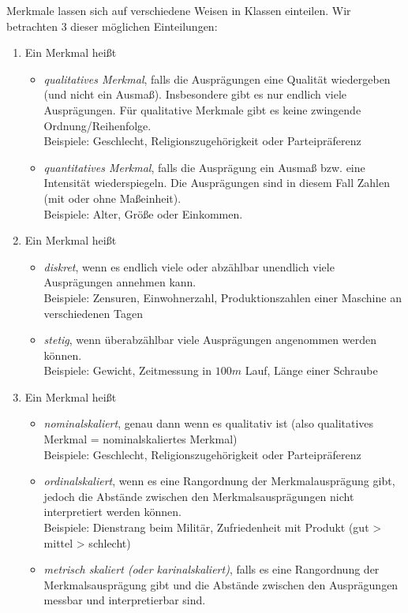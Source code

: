  Merkmale lassen sich auf verschiedene Weisen in Klassen einteilen. Wir betrachten 3 dieser möglichen Einteilungen:
\begin{enumerate}[label=(\Alph*)]
\item Ein Merkmal heißt
\begin{itemize}
\item \emph{qualitatives Merkmal}, falls die Ausprägungen eine Qualität wiedergeben (und nicht ein Ausmaß). Insbesondere gibt es nur endlich viele Ausprägungen. Für qualitative Merkmale gibt es keine zwingende Ordnung/Reihenfolge.\\
Beispiele: Geschlecht, Religionszugehörigkeit oder Parteipräferenz
\item \emph{quantitatives Merkmal}, falls die Ausprägung ein Ausmaß bzw. eine Intensität wiederspiegeln. Die Ausprägungen sind in diesem Fall Zahlen (mit oder ohne Maßeinheit).\\
Beispiele: Alter, Größe oder Einkommen.
\end{itemize}
\item Ein Merkmal heißt
\begin{itemize}
\item \emph{diskret}, wenn es endlich viele oder abzählbar unendlich viele Ausprägungen annehmen kann.\\
Beispiele: Zensuren, Einwohnerzahl, Produktionszahlen einer Maschine an verschiedenen Tagen
\item \emph{stetig}, wenn überabzählbar viele Ausprägungen angenommen werden können.\\
Beispiele: Gewicht, Zeitmessung in $100\unit{m}$ Lauf, Länge einer Schraube
\end{itemize}
\item Ein Merkmal heißt
\begin{itemize}
\item \emph{nominalskaliert}, genau dann wenn es qualitativ ist (also qualitatives Merkmal = nominalskaliertes Merkmal)\\
Beispiele: Geschlecht, Religionszugehörigkeit oder Parteipräferenz
\item \emph{ordinalskaliert}, wenn es eine Rangordnung der Merkmalausprägung gibt, jedoch die Abstände zwischen den Merkmalsausprägungen nicht interpretiert werden können.\\
Beispiele: Dienstrang beim Militär, Zufriedenheit mit Produkt (gut > mittel > schlecht)
\item \emph{metrisch skaliert (oder karinalskaliert)}, falls es eine Rangordnung der Merkmalsausprägung gibt und die Abstände zwischen den Ausprägungen messbar und interpretierbar sind.\\

\end{itemize}
\end{enumerate}
